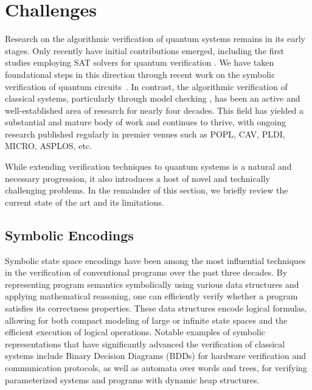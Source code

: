 \section{Challenges}
\label{challenges:section}

Research on the algorithmic verification of quantum systems remains in its early stages.
%
Only recently have initial contributions emerged, including the first studies employing SAT solvers for quantum verification \citep{DBLP:conf/cade/ChenRT23}.
%
We have taken foundational steps in this direction through recent work on the symbolic verification of quantum circuits~\citep{PLanQC25,DBLP:journals/pacmpl/AbdullaCCHLLLT25,CACM25,ChenCLLTY23,ChenCLLT23,chen2025autoq}.
%
In contrast, the algorithmic verification of classical systems, particularly through model checking \cite{DBLP:reference/mc/2018,DBLP:books/daglib/0020348}, has been an active and well-established area of research for nearly four decades.
%
This field has yielded a substantial and mature body of work and continues to thrive, with ongoing research published regularly in premier venues such as {\sc POPL}, {\sc CAV}, {\sc PLDI}, {\sc MICRO}, {\sc ASPLOS}, etc.
%

While extending verification techniques to quantum systems is a natural and necessary progression, it also introduces a host of novel and technically challenging problems.
%
In the remainder of this section, we briefly review the current state of the art and its limitations.
%

\subsection{Symbolic Encodings}

Symbolic state space encodings have been among the most influential techniques in the verification of conventional programs over the past three decades.
%
By representing program semantics symbolically using various data structures and applying mathematical reasoning, one can efficiently verify whether a program satisfies its correctness properties.
%
These data structures encode logical formulas, allowing for both compact modeling of large or infinite state spaces and the efficient execution of logical operations.
%
Notable examples of symbolic representations that have significantly advanced the verification of classical systems include Binary Decision Diagrams (BDDs) for hardware verification and communication protocols, as well as automata over words and trees, for verifying parameterized systems and programs with dynamic heap structures.
%

